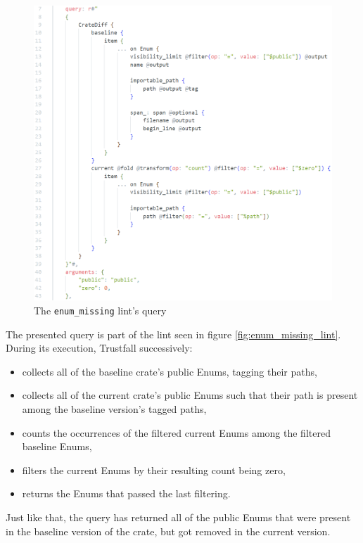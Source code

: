 \documentclass[licencjacka,en]{pracamgr}
\begin{document}
\begin{figure}[h]
	\centering
	\includegraphics[width=0.975\linewidth]{lint-query-example.png}
	\caption{The \texttt{enum\_missing} lint's query}
	\label{fig:enum_missing_lint_query}
\end{figure}

The presented query is part of the lint seen in figure \ref{fig:enum_missing_lint}.
During its execution, Trustfall successively:
\begin{itemize}
	\item collects all of the baseline crate's public Enums, tagging their paths,
	\item collects all of the current crate's public Enums such that their path is present among
		the baseline version's tagged paths,
	\item counts the occurrences of the filtered current Enums among the filtered baseline Enums,
	\item filters the current Enums by their resulting count being zero,
	\item returns the Enums that passed the last filtering.
\end{itemize}
Just like that, the query has returned all of the public Enums that were present in the baseline
version of the crate, but got removed in the current version.
\end{document}

